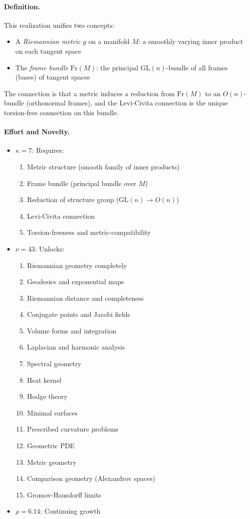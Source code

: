 \documentclass[11pt]{article}
\theoremstyle{definition}
\begin{document}
\paragraph{Definition.}
This realization unifies two concepts:
\begin{itemize}
\item A \emph{Riemannian metric} $g$ on a manifold $M$: a smoothly varying inner product on each tangent space
\item The \emph{frame bundle} $\text{Fr}(M)$: the principal $\text{GL}(n)$-bundle of all frames (bases) of tangent spaces
\end{itemize}

The connection is that a metric induces a reduction from $\text{Fr}(M)$ to an $O(n)$-bundle (orthonormal frames), and the Levi-Civita connection is the unique torsion-free connection on this bundle.

\paragraph{Effort and Novelty.}
\begin{itemize}
\item $\kappa = 7$: Requires:
\begin{enumerate}
\item Metric structure (smooth family of inner products)
\item Frame bundle (principal bundle over $M$)
\item Reduction of structure group ($\text{GL}(n) \to O(n)$)
\item Levi-Civita connection
\item Torsion-freeness and metric-compatibility
\end{enumerate}
\item $\nu = 43$: Unlocks:
\begin{enumerate}
\item Riemannian geometry completely
\item Geodesics and exponential maps
\item Riemannian distance and completeness
\item Conjugate points and Jacobi fields
\item Volume forms and integration
\item Laplacian and harmonic analysis
\item Spectral geometry
\item Heat kernel
\item Hodge theory
\item Minimal surfaces
\item Prescribed curvature problems
\item Geometric PDE
\item Metric geometry
\item Comparison geometry (Alexandrov spaces)
\item Gromov-Hausdorff limits
\end{enumerate}
\item $\rho = 6.14$: Continuing growth
\end{itemize}
\end{document}
